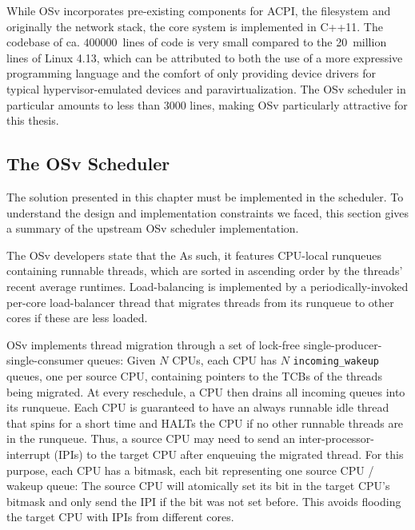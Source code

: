 \documentclass[12pt,a4paper]{book}
\begin{document}
While OSv incorporates pre-existing components for ACPI, the filesystem and originally the network stack, the core system is implemented in C++11.
The codebase of ca. $400000$~lines of code is very small compared to the 20~million lines of Linux 4.13, %
which can be attributed to both the use of a more expressive programming language and the comfort of only providing device drivers for typical hypervisor-emulated devices and paravirtualization.
The OSv scheduler in particular amounts to less than 3000 lines, making OSv particularly attractive for this thesis.%
~\cite{osvMain}

\subsection{The OSv Scheduler}\label{ch:di:osv:sched}
The solution presented in this chapter must be implemented in the scheduler.
To understand the design and implementation constraints we faced, this section gives a summary of the upstream OSv scheduler implementation.

The OSv developers state that the 
As such, it features CPU-local runqueues containing runnable threads, which are sorted in ascending order by the threads' recent average runtimes.
Load-balancing is implemented by a periodically-invoked per-core load-balancer thread that migrates threads from its runqueue to other cores if these are less loaded.~\cite{osvMain}

OSv implements thread migration through a set of lock-free single-producer-single-consumer queues:
Given $N$ CPUs, each CPU has $N$ \texttt{incoming\_wakeup} queues, one per source CPU, containing pointers to the TCBs of the threads being migrated.
At every reschedule, a CPU then drains all incoming queues into its runqueue.
Each CPU is guaranteed to have an always runnable idle thread that spins for a short time and HALTs the CPU if no other runnable threads are in the runqueue.
Thus, a source CPU may need to send an inter-processor-interrupt (IPIs) to the target CPU after enqueuing the migrated thread.
For this purpose, each CPU has a bitmask, each bit representing one source CPU / wakeup queue:
The source CPU will atomically set its bit in the target CPU's bitmask and only send the IPI if the bit was not set before.
This avoids flooding the target CPU with IPIs from different cores.~\cite{osvGit,osvMain}
\end{document}
